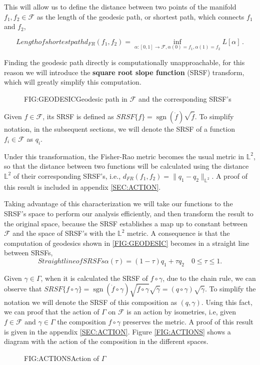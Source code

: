 This will allow us to define the distance between two points of the
manifold $f_1, f_2 \in \mathcal{F}$ as the length of the geodesic path, or shortest
path, which connects $f_1$ and $f_2$,

\begin{equation}[]{Length of shortest path}
d_{F R}\left(f_{1}, f_{2}\right)=\inf _{\alpha :[0,1]
\rightarrow \mathcal{F}, \alpha(0)=f_{1}, \alpha(1)=f_{2}} L[\alpha] \, .
\end{equation}

Finding the geodesic path directly is computationally unapproachable,
for this reason we will introduce the \textbf{square root slope function} (SRSF)
transform, which will greatly simplify this computation.

\begin{figure}[Geodesic path in $\mathcal{F}$]{FIG:GEODESIC}{Geodesic path in $\mathcal{F}$ and the corresponding SRSF's}
   \quad
\end{figure}

Given $f \in \mathcal{F}$, its SRSF is defined as
$SRSF\{f\} = \operatorname{sgn}{(\dot f)} \sqrt{\dot f}$. To simplify notation, in the
subsequent sections, we will denote the SRSF of a function
$f_i \in \mathcal{F}$ as $q_i$.

Under this transformation, the Fisher-Rao metric becomes the usual metric
in $\mathbb{L}^2$, so that the distance between two functions will be
calculated using the distance $\mathbb{L}^2$ of their corresponding
SRSF's, i.e.,  $d_{FR}(f_1, f_2) = \| q_1 - q_2 \|_{\mathbb{L}^2}$. A proof of
this result is included in appendix \ref{SEC:ACTION}.

Taking advantage of this characterization we will take our functions to the
SRSF's space to perform our analysis efficiently, and then transform the result
to the original space, because the SRSF establishes a map up to constant between
$\mathcal{F}$ and the space of SRSF's with the $\mathbb{L}^2$ metric.
A consequence is that the computation of geodesics shown in
\ref{FIG:GEODESIC} becomes in a straight line
between SRSFs,
\begin{equation}[]{Straight line of SRSFs}
\alpha(\tau) = (1 - \tau)q_1 + \tau q_2 \quad 0 \le \tau \le 1.
\end{equation}

Given $\gamma \in \Gamma$, when it is calculated the SRSF of $f \circ \gamma$,
due to the chain rule, we can observe that
$SRSF\{f \circ \gamma\} = \operatorname{sgn}(\dot{f} \circ \gamma) \sqrt{\dot f \circ \gamma}
\sqrt{\dot \gamma} = (q \circ \gamma) \sqrt{\dot \gamma}$. To simplify the
notation we  will denote the SRSF of this composition as $(q, \gamma)$.
Using this fact, we can proof that the action of $\Gamma$ on $\mathscr{F}$ is an
action by isometries, i.e, given $f  \in \mathscr{F}$ and $\gamma \in \Gamma$
the composition $f \circ \gamma$ preserves the metric.
A proof of this result is given in the appendix \ref{SEC:ACTION}.
Figure \ref{FIG:ACTIONS} shows a diagram with the action of the composition
in the different spaces.

\begin{figure}[Action of $\Gamma$]{FIG:ACTIONS}{Action of $\Gamma$}


\end{figure}
